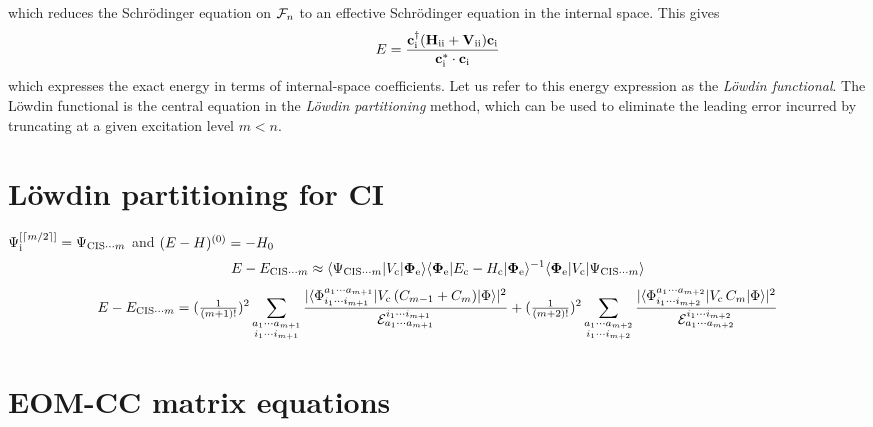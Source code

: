 \documentclass[11pt]{article}
\numberwithin{equation}{section}
\begin{document}
\begin{rmk}
which reduces the Schr\"odinger equation on $\mathcal{F}_n$ to an effective Schr\"odinger equation in the internal space.
This gives
\begin{align}
\label{eq:lowdin-functional}
  E
=
  \frac {
    \mathbf{c}_{\mathrm{i}}^\dagger
    (
      \mathbf{H}_{\mathrm{ii}}
    +
      \mathbf{V}_{\mathrm{ii}}
    )
    \mathbf{c}_{\mathrm{i}}
  }{
    \mathbf{c}_{\mathrm{i}}^*\cdot
    \mathbf{c}_{\mathrm{i}}
  }
\end{align}
which expresses the exact energy in terms of internal-space coefficients.
Let us refer to this energy expression as the \textit{L\"owdin functional}.
The L\"owdin functional is the central equation in the \textit{L\"owdin partitioning} method, which can be used to eliminate the leading error incurred by truncating at a given excitation level $m<n$.
\end{rmk}


\section{L\"owdin partitioning for CI}


\begin{rmk}
$
  \Psi _{\mathrm{i}}^{[\left\lceil m/2\right\rceil]}
=
  \Psi _{\mathrm{CIS}{\cdots}m}
$
and
$
(
  E
-
  H
)^{(0)}
=
-
  H_0
$
\begin{align}
  E
-
  E_{\mathrm{CIS}{\cdots}m}
\approx
  \langle\Psi _{\mathrm{CIS}{\cdots}m}|V_{\mathrm{c}}|\mathbf{\Phi }_{\mathrm{e}}\rangle
  \langle\mathbf{\Phi }_{\mathrm{e}}|E_{\mathrm{c}} - H_{\mathrm{c}}|\mathbf{\Phi }_{\mathrm{e}}\rangle^{-1}
  \langle\mathbf{\Phi }_{\mathrm{e}}|V_{\mathrm{c}}|\Psi _{\mathrm{CIS}{\cdots}m}\rangle
\end{align}
\begin{align}
  E
-
  E_{\mathrm{CIS}{\cdots}m}
=
  (\tfrac{1}{(m+1)!})^2
  \sum_{\substack{a_1\cdots a_{m+1}\\i_1\cdots i_{m+1}}}
  \frac {
    |\langle\Phi _{i_1\cdots i_{m+1}}^{a_1\cdots a_{m+1}}|V_{\mathrm{c}}\,(C_{m-1} + C_m)|\Phi \rangle|^2
  }{
    \mathcal{E}_{a_1\cdots a_{m+1}}^{i_1\cdots i_{m+1}}
  }
+
  (\tfrac{1}{(m+2)!})^2
  \sum_{\substack{a_1\cdots a_{m+2}\\i_1\cdots i_{m+2}}}
  \frac {
    |\langle\Phi _{i_1\cdots i_{m+2}}^{a_1\cdots a_{m+2}}|V_{\mathrm{c}}\,C_m|\Phi \rangle|^2
  }{
    \mathcal{E}_{a_1\cdots a_{m+2}}^{i_1\cdots i_{m+2}}
  }
\end{align}
\end{rmk}



\section{EOM-CC matrix equations}
\end{document}
